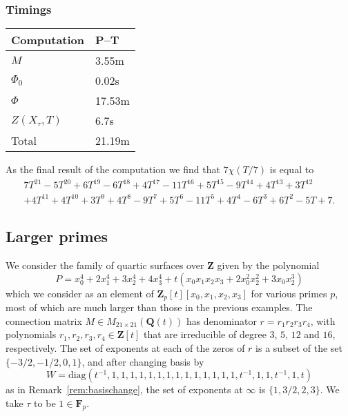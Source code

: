 \documentclass[a4paper,11pt]{article}
\numberwithin{equation}{section}
\newcommand{\ZZ}{\mathbf{Z}} %
\newcommand{\QQ}{\mathbf{Q}} %
\newcommand{\FF}{\mathbf{F}} %
\theoremstyle{definition}
\begin{document}
\subsubsection{Timings}

\begin{center}
\begin{tabular}{l l} \toprule
Computation     & P--T \\ \midrule
$M$             & 3.55m     \\
$\Phi_0$        & 0.02s     \\
$\Phi$          & 17.53m     \\
$Z(X_{\tau},T)$ & 6.7s     \\
Total           & 21.19m     \\ \bottomrule
\end{tabular}
\end{center}

\bigskip

As the final result of the computation we find that $7 \chi(T/7)$ is equal to 
\begin{multline*}
7T^{21} - 5T^{20} + 6T^{19} - 6T^{18} + 4T^{17} - 11T^{16} + 5T^{15} - 9T^{14} + 4T^{13} + 3T^{12} \\
+ 4T^{11} + 4T^{10} + 3T^9 + 4T^8 - 9T^7 + 5T^6 - 11T^5 + 4T^4 - 6T^3 + 6T^2 - 5T + 7.
\end{multline*}

\subsection{Larger primes}

We consider the family of quartic surfaces over $\ZZ$ given by the polynomial 
\begin{equation*}
P=x_0^4 + 2x_1^4 + 3x_2^4 + 4x_3^4 + t(x_0x_1x_2x_3 + 2 x_0^2 x_2^2 + 3x_0x_2^3)
\end{equation*}
which we consider as an element of $\ZZ_p[t][x_0,x_1,x_2,x_3]$ for various
primes $p$, most of which are much larger than those in the previous examples.
The connection matrix $M \in M_{21 \times 21}(\QQ(t))$ has denominator 
$r = r_1 r_2 r_3 r_4$, with polynomials $r_1,r_2,r_3,r_4 \in \ZZ[t]$ that are 
irreducible of degree $3$, $5$, $12$ and $16$, respectively. The set of
exponents at each of the zeros of $r$ is a subset of the set $\{-3/2,-1/2,0,1\}$,
and after changing basis by 
\[
W=\mbox{diag}(t^{-1},1,1,1,1,1,1,1,1,1,1,1,1,1,1,t^{-1},1,1,t^{-1},1,t)
\] 
as in Remark~\ref{rem:basischange}, the set of exponents  at $\infty$ is
$\{1,3/2,2,3\}$. We take $\tau$ to be $1 \in \FF_p$.
\end{document}
